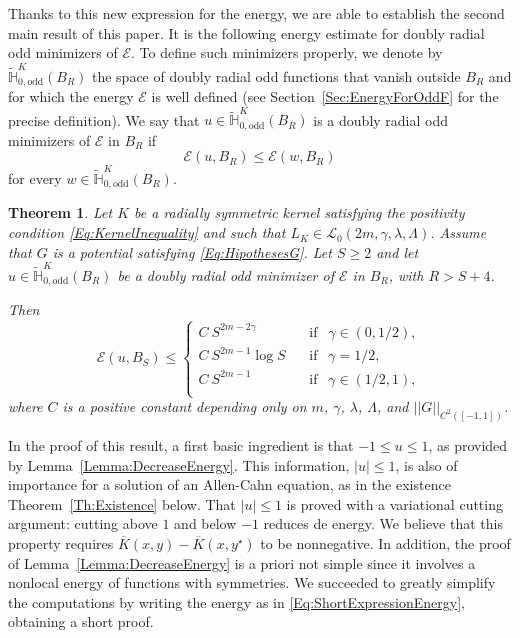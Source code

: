 \documentclass[12pt,reqno]{amsart}
\newtheorem{theorem}{Theorem}[section]
\theoremstyle{definition}
\theoremstyle{remark}
\newcommand{\con}[1]{\mathbb{#1}}
\renewcommand{\H}{\con{H}}
\newcommand{\ecal}{\mathcal{E}}
\newcommand{\lcal}{\mathcal{L}}
\newcommand{\norm}[1]{\left | \left |{#1} \right | \right |}
\newcommand{\s}{\gamma}
\numberwithin{equation}{section}
\begin{document}
Thanks to this new expression for the energy, we are able to establish the second main result of this paper. It is the following energy estimate for doubly radial odd minimizers of $\ecal$. To define such minimizers properly, we denote by $\widetilde{\H}^K_{0, \mathrm{odd}}(B_R)$ the space of doubly radial odd functions that vanish outside $B_R$ and for which the energy $\ecal$ is well defined (see Section~\ref{Sec:EnergyForOddF} for the precise definition). We say that $u\in \widetilde{\H}^K_{0, \mathrm{odd}}(B_R)$ is a doubly radial odd minimizers of $\ecal$ in $B_R$ if
$$
\ecal(u,B_R) \leq \ecal (w,B_R)
$$
for every $w\in \widetilde{\H}^K_{0, \mathrm{odd}}(B_R)$. 

\begin{theorem}
	\label{Th:EnergyEstimate} 
	Let $K$ be a radially symmetric kernel satisfying the positivity condition \eqref{Eq:KernelInequality} and such that $L_K\in \lcal_0(2m, \s, \lambda, \Lambda)$. Assume that $G$ is a potential satisfying \eqref{Eq:HipothesesG}. Let $S\geq2$ and let $u\in \widetilde{\H}^K_{0, \mathrm{odd}}(B_R)$ be a doubly radial odd minimizer of $\ecal$ in $B_R$, with $R>S+4$. 
	
	Then
	\begin{equation}
	\label{Eq:EnergyEstimate} 
	\ecal (u,B_S) \leq 
	\begin{cases}
	C \ S^{2m-2\s}\ \ \ \ &\textrm{if } \ \ \s\in(0,1/2),\\
	C \ S^{2m-1} \log S\ \ \ \ &\textrm{if } \ \ \s=1/2,\\
	C \ S^{2m-1}\ \ \ \ &\textrm{if } \ \ \s\in(1/2,1),\\
	\end{cases}
	\end{equation}
	where $C$ is a positive constant depending only on $m$, $\s$, $\lambda$, $\Lambda$, and $\norm{G}_{C^2([-1,1])}$.
\end{theorem}


In the proof of this result, a first basic ingredient is that $-1\leq u\leq 1$, as provided by Lemma~\ref{Lemma:DecreaseEnergy}. This information, $|u|\leq 1$, is also of importance for a solution of an Allen-Cahn equation, as in the existence Theorem~\ref{Th:Existence} below. That $|u|\leq 1$ is proved with a variational cutting argument: cutting above $1$ and below $-1$ reduces de energy. We believe that this property requires $\overline{K}(x,y)- \overline{K}(x,y^\star)$ to be nonnegative. In addition, the proof of Lemma~\ref{Lemma:DecreaseEnergy} is a priori not simple since it involves a nonlocal energy of functions with symmetries. We succeeded to greatly simplify the computations by writing the energy as in \eqref{Eq:ShortExpressionEnergy}, obtaining a short proof.
\end{document}
